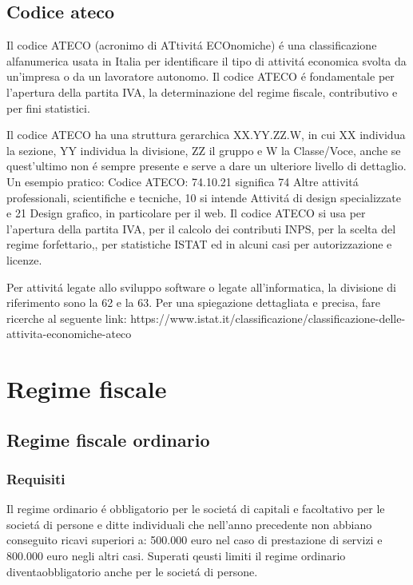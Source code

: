 \documentclass{article}
\begin{document}
\subsection{Codice ateco}
Il codice ATECO (acronimo di ATtivit\'a ECOnomiche) \'e una classificazione alfanumerica usata in Italia per identificare il tipo di attivit\'a economica svolta da un'impresa o da un lavoratore autonomo. Il codice ATECO \'e fondamentale per l'apertura della partita IVA, la determinazione del regime fiscale, contributivo e per fini statistici. 

Il codice ATECO ha una struttura gerarchica XX.YY.ZZ.W, in cui XX individua la sezione, YY individua la divisione, ZZ il gruppo e W la Classe/Voce, anche se quest'ultimo non \'e sempre presente e serve a dare un ulteriore livello di dettaglio. Un esempio pratico: Codice ATECO: 74.10.21 significa 74 Altre attivit\'a professionali, scientifiche e tecniche, 10 si intende Attivit\'a di design specializzate e 21 Design grafico, in particolare per il web. Il codice ATECO si usa per l'apertura della partita IVA, per il calcolo dei contributi INPS, per la scelta del regime forfettario,, per statistiche ISTAT ed in alcuni casi per autorizzazione e licenze.

Per attivit\'a legate allo sviluppo software o legate all'informatica, la divisione di riferimento sono la 62 e la 63. 
Per una spiegazione dettagliata e precisa, fare ricerche al seguente link: https://www.istat.it/classificazione/classificazione-delle-attivita-economiche-ateco


\section{Regime fiscale}

\subsection{Regime fiscale ordinario}
\subsubsection{Requisiti}
Il regime ordinario \'e obbligatorio per le societ\'a di capitali e 
facoltativo per le societ\'a di persone e ditte individuali che nell'anno precedente non abbiano conseguito ricavi superiori a: 
500.000 euro nel caso di prestazione di servizi e 800.000 euro negli altri casi. Superati qeusti limiti il regime ordinario diventaobbligatorio anche per le societ\'a di persone.
\end{document}
